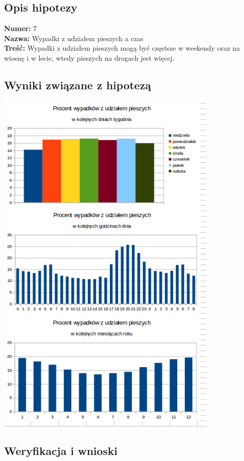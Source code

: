 \subsection{Opis hipotezy}\label{opis-hipotezy}

\textbf{Numer:} 7\\\textbf{Nazwa:} Wypadki z udziałem pieszych a
czas\\\textbf{Treść:} Wypadki z udziałem pieszych mogą być częstsze w
weekendy oraz na wiosnę i w lecie, wtedy pieszych na drogach jest
więcej.

\subsection{Wyniki związane z
hipotezą}\label{wyniki-zwiazane-z-hipoteza}

\centerline{\includegraphics[width=0.8\textwidth]{images/hipotheses/pedestrians/pedestrians.png}}

\subsection{Weryfikacja i wnioski}\label{weryfikacja-i-wnioski}


